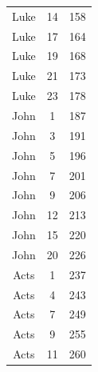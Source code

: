 \documentclass{article}
\newlength{\minipageheight}
\newlength{\minipagewidth}
\begin{document}
\begin{minipage}[r][\minipageheight][t]{\minipagewidth}
\begin{center}
\begin{tabular}{|c|c|c|}
            Luke    & 14      & 158        \\
            Luke    & 17      & 164        \\
            Luke    & 19      & 168        \\
            Luke    & 21      & 173        \\
            Luke    & 23      & 178        \\
            John    & 1       & 187        \\
            John    & 3       & 191        \\
            John    & 5       & 196        \\
            John    & 7       & 201        \\
            John    & 9       & 206        \\
            John    & 12      & 213        \\
            John    & 15      & 220        \\
            John    & 20      & 226        \\
            Acts    & 1       & 237        \\
            Acts    & 4       & 243        \\
            Acts    & 7       & 249        \\
            Acts    & 9       & 255        \\
            Acts    & 11      & 260        \\
            \hline
        \end{tabular}
    \end{center}
\end{minipage}%


\end{document}
